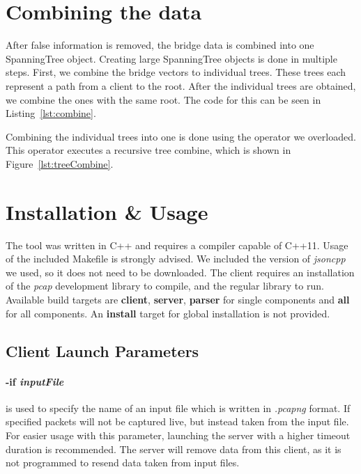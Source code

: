 \section{Combining the data}
\label{combining_data}
After false information is removed, the bridge data is combined into one SpanningTree object.
Creating large SpanningTree objects is done in multiple steps.
First, we combine the bridge vectors to individual trees.
These trees each represent a path from a client to the root.
After the individual trees are obtained, we combine the ones with the same root.
The code for this can be seen in Listing~\ref{lst:combine}.

Combining the individual trees into one is done using the operator we overloaded.
This operator executes a recursive tree combine, which is shown in Figure~\ref{lst:treeCombine}.


\section{Installation \& Usage}
The tool was written in C++ and requires a compiler capable of C++11.
Usage of the included Makefile is strongly advised.
We included the version of \textit{jsoncpp} we used, so it does not need to be downloaded.
The client requires an installation of the \textit{pcap} development library to compile, and the regular library to run.
Available build targets are \textbf{client}, \textbf{server}, \textbf{parser} for single components and \textbf{all} for all components.
An \textbf{install} target for global installation is not provided.
\subsection*{Client Launch Parameters}
\paragraph{-if \textit{inputFile}} is  used to specify the name of an input file which is written in \textit{.pcapng} format.
If specified packets will not be captured live, but instead taken from the input file.
For easier usage with this parameter, launching the server with a higher timeout duration is recommended.
The server will remove data from this client, as it is not programmed to resend data taken from input files.

